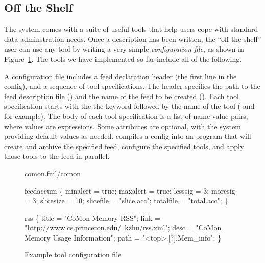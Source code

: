 \subsection{Off the Shelf}
\label{sec:tools}
The \padsd{} system comes with a suite of useful tools that help users cope with standard data 
adminstration needs.  Once a \padsd{} description has been written, the ``off-the-shelf''
user can use any tool by writing a very simple {\em configuration file}, as shown in
Figure~\ref{fig:toolconfigs}. The tools we have implemented so far include all of the following.

A configuration file includes a feed declaration header 
(the first line in the config),
and a sequence of tool specifications. The header specifies the path to the 
feed description file () and the name of the feed to be created ().
Each tool specification starts with the the keyword  followed by the
name of the tool ( and  for example). The body of each tool specification 
is a list of name-value pairs, where values are \ocaml{} expressions. Some attributes are 
optional, with the system providing default values as needed. 
\padsd{} compiles a config into an \ocaml{} program that will create and archive the specified 
feed, configure the specified tools, and apply those tools to the feed in parallel.


\begin{figure}[tb]
\centering
\begin{codebox}
 comon.fml/comon

 feedaccum
\{
  minalert  = true;
  maxalert  = true;
  lesssig   = 3;
  moresig   = 3;
  slicesize = 10;
  slicefile = "slice.acc";
  totalfile = "total.acc";
\}

 rss
\{
  title = "CoMon Memory RSS";
  link  = "http://www.cs.princeton.edu/~kzhu/rss.xml";
  desc  = "CoMon Memory Usage Information";
  path  = "<top>.[?].Mem_info";
\}
\end{codebox}
\caption{Example tool configuration file}
\label{fig:toolconfigs}
\end{figure}






